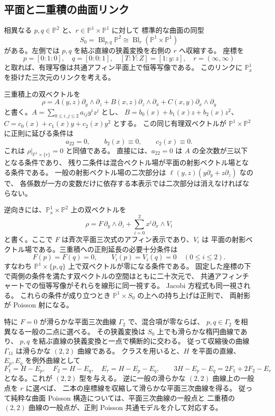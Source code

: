 \subsection{平面と二重積の曲面リンク}
\label{subsec:classical-surface-link}
相異なる $p,q\in\mathbb P^2$ と、$r\in\mathbb P^1\times\mathbb P^1$ に対して
標準的な曲面の同型
\[
 S_0=\operatorname{Bl}_{p,q}\mathbb P^2
 \cong\operatorname{Bl}_{r}(\mathbb P^1\times\mathbb P^1)
\]
がある。左側では $p,q$ を結ぶ直線の狭義変換を右側の $r$ へ収縮する。
座標を
\[
 p=[0:1:0],\quad q=[0:0:1],\quad
 [T:Y:Z]=[1:y:z],\quad r=(\infty,\infty)
\]
と取れば、有理写像は共通アフィン平面上で恒等写像である。
このリンクに $\mathbb P^1_x$ を掛けた三次元のリンクを考える。

三重積上の双ベクトルを
\[
 \rho=A(y,z)\partial_y\wedge\partial_z+
       B(x,z)\partial_z\wedge\partial_x+
       C(x,y)\partial_x\wedge\partial_y
\]
と書く。$A=\sum_{0\le i,j\le2}a_{ij}y^iz^j$ とし、
$B=b_0(x)+b_1(x)z+b_2(x)z^2$、
$C=c_0(x)+c_1(x)y+c_2(x)y^2$ とする。
この同じ有理双ベクトルが $\mathbb P^1\times\mathbb P^2$ に正則に延びる条件は
\begin{equation}\label{eq:surface-link-conditions}
 a_{22}=0,\qquad b_2(x)\equiv0,\qquad c_2(x)\equiv0.
\end{equation}
これは $\rho|_{\mathbb P^1\times\{r\}}=0$ と同値である。
直接には、$a_{22}=0$ は $A$ の全次数が三以下となる条件であり、
残り二条件は混合ベクトル場が平面の射影ベクトル場となる条件である。
一般の射影ベクトル場の二次部分は
$\ell(y,z)(y\partial_y+z\partial_z)$ なので、
各係数が一方の変数だけに依存する本表示では二次部分は消えなければならない。

逆向きには、$\mathbb P^1_x\times\mathbb P^2$ 上の双ベクトルを
\[
 \rho=F\,\partial_y\wedge\partial_z+
       \sum_{i=0}^2 x^i\partial_x\wedge V_i
\]
と書く。ここで $F$ は斉次平面三次式のアフィン表示であり、$V_i$ は
平面の射影ベクトル場である。三重積への正則延長の必要十分条件は
\[
 F(p)=F(q)=0,\qquad V_i(p)=V_i(q)=0\quad(0\le i\le2).
\]
すなわち $\mathbb P^1\times\{p,q\}$ 上で双ベクトルが零になる条件である。
固定した座標の下で両側の条件を満たす双ベクトルの空間はともに二十次元で、
共通アフィンチャートでの恒等写像がそれらを線形に同一視する。
Jacobi 方程式も同一視される。
これらの条件が成り立つとき $\mathbb P^1\times S_0$ の上への持ち上げは正則で、
両射影が Poisson 射になる。

特に $F=0$ が滑らかな平面三次曲線 $\Gamma_2$ で、混合項が零ならば、
$p,q\in\Gamma_2$ を相異なる一般の二点に選べる。
その狭義変換は $S_0$ 上でも滑らかな楕円曲線であり、
$p,q$ を結ぶ直線の狭義変換と一点で横断的に交わる。
従って収縮後の曲線 $\Gamma_{11}$ は滑らかな $(2,2)$ 曲線である。
クラスを用いると、$H$ を平面の直線、$E_p,E_q$ を例外曲線として
\[
 F_1=H-E_p,\quad F_2=H-E_q,\quad E_r=H-E_p-E_q,
 \qquad 3H-E_p-E_q=2F_1+2F_2-E_r
\]
となる。これが $(2,2)$ 型を与える。
逆に一般の滑らかな $(2,2)$ 曲線上の一般点を $r$ に選べば、
二本の座標線を収縮して滑らかな平面三次曲線を得る。
従って純粋な曲面 Poisson 構造については、平面三次曲線の一般点と
二重積の $(2,2)$ 曲線の一般点が、正則 Poisson 共通モデルを介して対応する。

